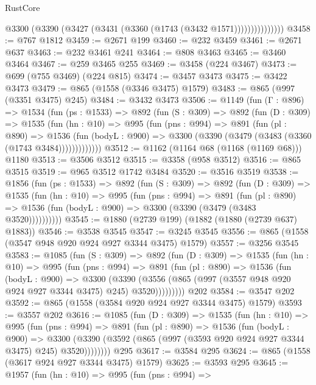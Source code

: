 \begin{lexlean}{RustCore}
\begin{coremodule}
{\begin{coremodule}
{{{{{{{{                    @3300 (@3390 (@3427 (@3431 (@3360 (@1743 (@3432 @1571)))))))))))))))
@3458 := @767 @1812
@3459 := @2671 @199
@3460 := @232 @3459
@3461 := @2671 @637
@3463 := @232 @3461 @241
@3464 := @808 @3463
@3465 := @3460 @3464
@3467 := @259 @3465 @255
@3469 := @3458 (@224 @3467)
@3473 := @699 (@755 @3469) (@224 @815)
@3474 := @3457 @3473
@3475 := @3422 @3473
@3479 := @865 (@1558 (@3346 @3475) @1579)
@3483 := @865 (@997 (@3351 @3475) @245)
@3484 := @3432 @3473
@3506 := @1149
    (fun (Γ : @896) =>
    @1534
      (fun (ps : @1533) =>
      @892
        (fun (S : @309) =>
        @892
          (fun (D : @309) =>
          @1535
            (fun (hn : @10) =>
            @995
              (fun (pns : @994) =>
              @891
                (fun (pl : @890) =>
                @1536
                  (fun (bodyL : @900) => @3300 (@3390 (@3479 (@3483 (@3360 (@1743 @3484)))))))))))))
@3512 := @1162 (@1164 @68 (@1168 (@1169 @68))) @1180
@3513 := @3506 @3512
@3515 := @3358 (@958 @3512)
@3516 := @865 @3515
@3519 := @965 @3512 @1742 @3484
@3520 := @3516 @3519
@3538 := @1856
    (fun (ps : @1533) =>
    @892
      (fun (S : @309) =>
      @892
        (fun (D : @309) =>
        @1535
          (fun (hn : @10) =>
          @995
            (fun (pns : @994) =>
            @891
              (fun (pl : @890) =>
              @1536 (fun (bodyL : @900) => @3300 (@3390 (@3479 (@3483 @3520))))))))))
@3545 := @1880 (@2739 @199) (@1882 (@1880 (@2739 @637) @1883))
@3546 := @3538 @3545
@3547 := @3245 @3545
@3556 := @865 (@1558 (@3547 @948 @920 @924 @927 @3344 @3475) @1579)
@3557 := @3256 @3545
@3583 := @1085
    (fun (S : @309) =>
    @892
      (fun (D : @309) =>
      @1535
        (fun (hn : @10) =>
        @995
          (fun (pns : @994) =>
          @891
            (fun (pl : @890) =>
            @1536
              (fun (bodyL : @900) =>
              @3300
                (@3390
                  (@3556 (@865 (@997 (@3557 @948 @920 @924 @927 @3344 @3475) @245) @3520)))))))))
    @202
@3584 := @3547 @202
@3592 := @865 (@1558 (@3584 @920 @924 @927 @3344 @3475) @1579)
@3593 := @3557 @202
@3616 := @1085
    (fun (D : @309) =>
    @1535
      (fun (hn : @10) =>
      @995
        (fun (pns : @994) =>
        @891
          (fun (pl : @890) =>
          @1536
            (fun (bodyL : @900) =>
            @3300 (@3390 (@3592 (@865 (@997 (@3593 @920 @924 @927 @3344 @3475) @245) @3520))))))))
    @295
@3617 := @3584 @295
@3624 := @865 (@1558 (@3617 @924 @927 @3344 @3475) @1579)
@3625 := @3593 @295
@3645 := @1957
    (fun (hn : @10) =>
    @995
      (fun (pns : @994) =>
}}}}}}}}
\end{coremodule}}
\end{coremodule}
\end{lexlean}
